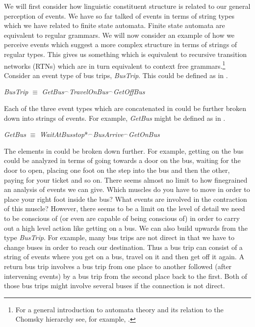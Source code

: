 We will first consider how linguistic constituent structure is related
to our general perception of events.  We have so far talked of events
in terms of string types which we have related to finite state
automata.  Finite state automata are equivalent to regular grammars.
We will now consider an example of how we perceive events which
suggest a more complex structure in terms of strings of regular
types.  This gives us something which is equivalent to recursive
transition networks (RTNs) which are in turn equivalent to context
free grammars.\footnote{For a general introduction to automata theory
  and its relation to the Chomsky hierarchy see, for example,
  \cite{ParteeMeulenWall1990}.}  Consider an event type of bus trips,
\textit{BusTrip}.  This could be defined as in \nexteg{}.
\begin{ex} 
\textit{BusTrip} $\equiv$
\textit{GetBus}$^{\frown}$\textit{TravelOnBus}$^{\frown}$\textit{GetOffBus} 
\label{ex:bustrip}
\end{ex} 
Each of the three event types which are concatenated in \preveg{}
could be further broken down into strings of events.  For example,
\textit{GetBus} might be defined as in \nexteg{}.
\begin{ex} 
\textit{GetBus} $\equiv$ \textit{WaitAtBusstop}*$^{\frown}$\textit{BusArrive}$^{\frown}$\textit{GetOnBus} 
\end{ex} 
The elements in \preveg{} could be broken down further.  For example,
getting on the bus could be analyzed in terms of going towards a door
on the bus, waiting for the door to open, placing one foot on the step
into the bus and then the other, paying for your ticket and so on.
There seems almost no limit to how finegrained an analysis of events
we can give.  Which muscles do you have to move in order to place your
right foot inside the bus?  What events are involved in the contraction
of this muscle?  However, there seems to be a limit on the level of
detail we need to be conscious of (or even are capable of being
conscious of) in order to carry out a high level action like getting
on a bus.  We can also build upwards from the type \textit{BusTrip}.
For example, many bus trips are not direct in that we have to change
buses in order to reach our destination.  Thus a bus trip can consist
of a string of events where you get on a bus, travel on it and then
get off it again.  A return bus trip involves a bus trip from one
place to another followed (after intervening events) by a bus trip
from the second place back to the first.  Both of those bus trips
might involve several buses if the connection is not direct.   

